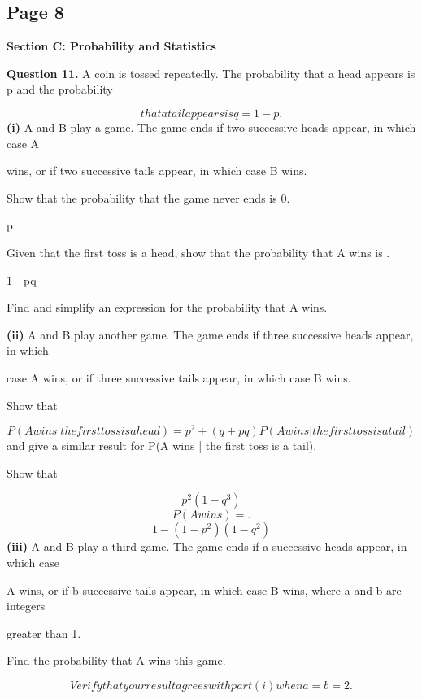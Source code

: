 \documentclass[12pt]{article}
\begin{document}
\subsection*{Page 8}
\begin{flushleft}
\bigskip\textbf{Section C: Probability and Statistics}\par
\bigskip\textbf{Question 11.} A coin is tossed repeatedly. The probability that a head appears is p and the probability\par
\[that a tail appears is q = 1 - p.\]
\textbf{(i)} A and B play a game. The game ends if two successive heads appear, in which case A\par
wins, or if two successive tails appear, in which case B wins.\par
Show that the probability that the game never ends is 0.\par
p\par
Given that the first toss is a head, show that the probability that A wins is .\par
1 - pq\par
Find and simplify an expression for the probability that A wins.\par
\textbf{(ii)} A and B play another game. The game ends if three successive heads appear, in which\par
case A wins, or if three successive tails appear, in which case B wins.\par
Show that\par
\[P(A wins | the first toss is a head) = p^2 + (q + pq) P(A wins | the first toss is a tail)\]
and give a similar result for P(A wins | the first toss is a tail).\par
Show that\par
\[p^2(1 - q^3)\]
\[P(A wins) = .\]
\[1 - (1 - p^2)(1 - q^2)\]
\textbf{(iii)} A and B play a third game. The game ends if a successive heads appear, in which case\par
A wins, or if b successive tails appear, in which case B wins, where a and b are integers\par
greater than 1.\par
Find the probability that A wins this game.\par
\[Verify that your result agrees with part (i) when a = b = 2.\]
\end{flushleft}
\end{document}

